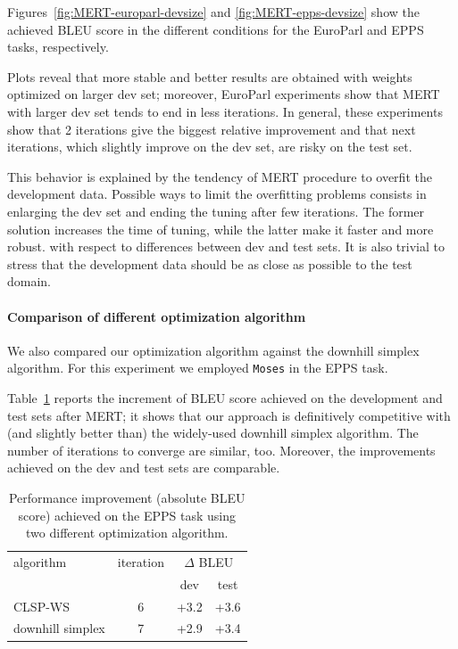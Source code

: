 \documentclass[11pt]{report}
\theoremstyle{plain}
\begin{document}
{Figures~\ref{fig:MERT-europarl-devsize} and \ref{fig:MERT-epps-devsize} show the achieved BLEU score in the different conditions for the EuroParl and EPPS tasks, respectively.

Plots reveal that more stable and better results are obtained with weights optimized on larger dev set; moreover, EuroParl experiments show that MERT with larger dev set tends to end in less iterations.
In general, these experiments show that 2 iterations give the biggest relative  improvement and that next iterations, which slightly improve on the dev set, are risky on the test set.

This behavior is explained by the tendency of MERT procedure to overfit the development data. Possible ways to limit the overfitting problems consists in enlarging the dev set  and ending the tuning after few iterations.
The former solution increases the time of tuning, while the latter make it faster and more robust. with respect to differences between dev and test sets. It is also trivial to stress that the development  data should be as close as possible to the test domain.


\paragraph{Comparison of different optimization algorithm} We also compared our optimization algorithm against the downhill simplex algorithm. For this experiment we employed {\tt Moses} in the EPPS task.

Table~\ref{tbl:MERT-epps-algorithm} reports the increment of BLEU score achieved on the development and test sets after MERT; it shows that our approach is definitively competitive with (and slightly better than) the widely-used downhill simplex algorithm. The number of iterations to converge are similar, too.
Moreover, the improvements achieved on the dev and test sets are comparable.


 \begin{table}[ht]
\begin{center}
\label{tbl:MERT-epps-algorithm}
\begin{tabular}{l|ccc}
algorithm               & iteration & \multicolumn{2}{c}{$\Delta$ BLEU}\\
                                &                & dev & test\\
\hline
CLSP-WS              & 6 & +3.2 & +3.6 \\
downhill simplex  & 7 & +2.9  & +3.4\\
\end{tabular}
\caption{Performance improvement (absolute BLEU score) achieved on the EPPS task using two different optimization algorithm.}
\end{center}
\end{table}

}
\end{document}

